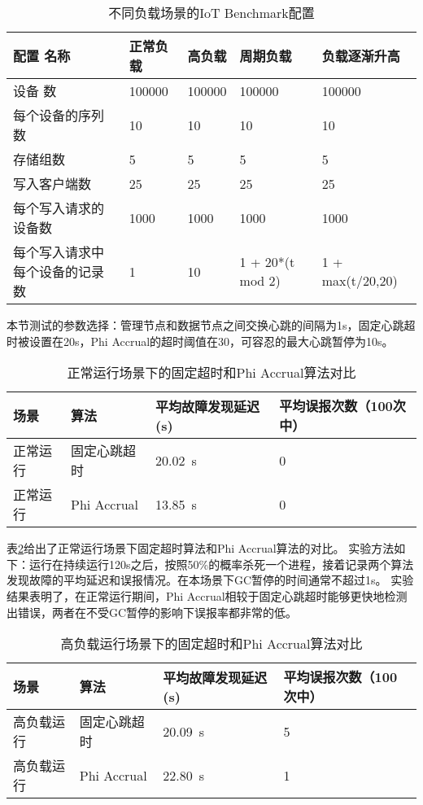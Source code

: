 \begin{table}[h!]
    \centering
    \caption{不同负载场景的IoT Benchmark配置}
    \label{tab:extended_columns}
    \begin{tabular}{lllll}
        \toprule
        配置 名称 & 正常负载 & 高负载 & 周期负载 & 负载逐渐升高 \\
        \midrule
        设备 数 & 100000 & 100000 & 100000 & 100000 \\
        每个设备的序列数 & 10 & 10 & 10 & 10  \\
        存储组数 & 5 & 5 & 5 & 5 \\
        写入客户端数 & 25 & 25 & 25 & 25 \\
        每个写入请求的设备数 & 1000 & 1000 & 1000 & 1000 \\
        每个写入请求中每个设备的记录数 & 1 & 10 & 1 + 20*(t mod 2) & 1 + max(t/20,20) \\
        \bottomrule
    \end{tabular}
\end{table}

本节测试的参数选择：管理节点和数据节点之间交换心跳的间隔为1s，固定心跳超时被设置在20s，Phi Accrual的超时阈值在30，可容忍的最大心跳暂停为10s。

\begin{table}[h!]
    \centering
    \caption{正常运行场景下的固定超时和Phi Accrual算法对比}
    \label{tab:exp-normal-load}
    \begin{tabular}{@{}llll@{}}
        \toprule
        场景 & 算法 & 平均故障发现延迟 (s) & 平均误报次数（100次中） \\
        \midrule
        正常运行 & 固定心跳超时 & \SI{20.02}{\second} & 0 \\
        正常运行 & Phi Accrual & \SI{13.85}{\second} & 0 \\
        \bottomrule
    \end{tabular}
\end{table}

表\ref{tab:exp-normal-load}给出了正常运行场景下固定超时算法和Phi Accrual算法的对比。
实验方法如下：运行在持续运行120s之后，按照50\%的概率杀死一个进程，接着记录两个算法发现故障的平均延迟和误报情况。在本场景下GC暂停的时间通常不超过1s。
实验结果表明了，在正常运行期间，Phi Accrual相较于固定心跳超时能够更快地检测出错误，两者在不受GC暂停的影响下误报率都非常的低。


\begin{table}[h!]
    \centering
    \caption{高负载运行场景下的固定超时和Phi Accrual算法对比}
    \label{tab:exp-high-load}
    \begin{tabular}{@{}llll@{}}
        \toprule
        场景 & 算法 & 平均故障发现延迟 (s) & 平均误报次数（100次中） \\
        \midrule
        高负载运行 & 固定心跳超时 & \SI{20.09}{\second} & 5 \\
        高负载运行 & Phi Accrual & \SI{22.80}{\second} & 1 \\
        \bottomrule
    \end{tabular}
\end{table}

